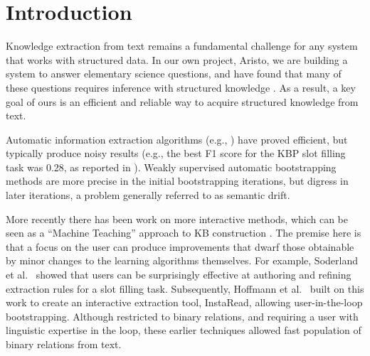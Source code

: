 \documentclass[11pt,letterpaper]{article}
\begin{document}
\section{Introduction}

Knowledge extraction from text remains a fundamental challenge for any system that works with structured data. In our own project, Aristo, we are building a system to answer elementary science questions, and have found that many of these questions requires inference with structured knowledge \cite{clark:2016}. As a result, a key goal of ours is an efficient and reliable way to acquire structured knowledge from text.

Automatic information extraction algorithms (e.g., \cite{Angeli2015LeveragingLS}) have proved efficient, but typically produce noisy results (e.g., the best F1 score for the KBP slot filling task was 0.28, as reported in  \cite{Angeli2015LeveragingLS}). Weakly supervised automatic bootstrapping methods \cite{Carlson:wsdm2010,Gupta2014ImprovedPL} are more precise in the initial bootstrapping iterations, but digress in later iterations, a problem generally referred to as semantic drift. 
 
More recently there has been work on more interactive methods, which can be seen as a ``Machine Teaching'' approach to KB construction \cite{Amershi2014PowerTT,Amershi2015ModelTrackerRP}. The premise here is that a focus on the user can produce improvements that dwarf those obtainable by minor changes to the learning algorithms themselves. For example, Soderland et al.~\cite{Soderland2013OpenIE} showed that users can be surprisingly effective at authoring and refining extraction rules for a slot filling task. Subsequently, Hoffmann et al.~\cite{Hoffmann2015ExtremeEO} built on this work to create an interactive extraction tool, InstaRead, allowing user-in-the-loop bootstrapping. Although restricted to binary relations, and requiring a user with linguistic expertise in the loop, these earlier techniques allowed fast population of binary relations from text.
\end{document}
